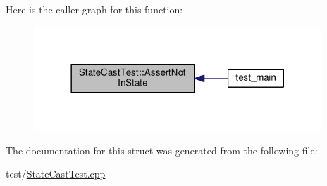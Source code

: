 Here is the caller graph for this function\+:
\nopagebreak
\begin{figure}[H]
\begin{center}
\leavevmode
\includegraphics[width=306pt]{struct_state_cast_test_a38608dc3d0e46414340f6333a0d16f5e_icgraph}
\end{center}
\end{figure}


The documentation for this struct was generated from the following file\+:\begin{DoxyCompactItemize}
\item 
test/\mbox{\hyperlink{_state_cast_test_8cpp}{State\+Cast\+Test.\+cpp}}\end{DoxyCompactItemize}
